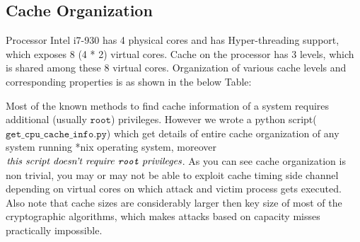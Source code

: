 \documentclass[twocolumn]{IEEEtran}
\begin{document}
\subsection {Cache Organization}
Processor Intel i7-930 has 4 physical cores and has Hyper-threading support\cite{intelhype}, which exposes 8 (4 * 2) virtual cores. Cache on the processor has 3 levels, which is shared among these 8 virtual cores. Organization of various cache levels and corresponding properties is as shown in the below Table:
\begin{center}
\end{center}
Most of the known methods to find cache information of a system requires additional (usually $\texttt{root}$) privileges. However we wrote a python script($\texttt{get\_cpu\_cache\_info.py}$) which get details of entire cache organization of any system running *nix operating system, moreover $\textit{this script doesn't require \texttt{root} privileges}$. As you can see cache organization is non trivial, you may or may not be able to exploit cache timing side channel depending on virtual cores on which attack and victim process gets executed. Also note that cache sizes are considerably larger then key size of most of the cryptographic algorithms, which makes attacks based on capacity misses practically impossible.
\end{document}
